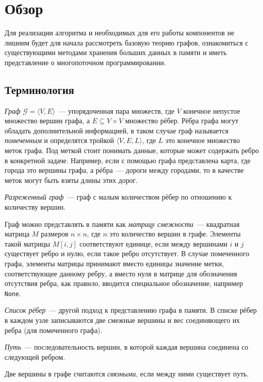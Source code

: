 
\section{Обзор}
\label{sec:relatedworks}
Для реализации алгоритма и необходимых для его работы компонентов не лишним будет для начала рассмотреть базовую теорию графов, ознакомиться с существующими методами хранения больших данных в памяти и иметь представление о многопоточном программировании.

\subsection{Терминология}
\textit{Граф} $\mathcal{G} = \langle V, E \rangle$~--- упорядоченная пара множеств, где $V$ конечное непустое множество вершин графа, а $E \subseteq V \times V$ множество рёбер. Рёбра графа могут обладать дополнительной информацией, в таком случае граф называется \textit{помеченным} и определятся тройкой $\langle V, E, L \rangle$, где $L$ это конечное множество меток графа. Под меткой стоит понимать данные, которые может содержать ребро в конкретной задаче. Например, если с помощью графа представлена карта, где города это вершины графа, а рёбра~--- дороги между городами, то в качестве меток могут быть взяты длины этих дорог.

\textit{Разреженный граф}~--- граф с малым количеством рёбер по отношению к количеству вершин.

Граф можно представлять в памяти как \textit{матрицу смежности}~--- квадратная матрица $M$ размеров $n \times n$, где $n$ это количество вершин в графе. Элементы такой матрицы $M[i,j]$ соответствуют единице, если между вершинами $i$ и $j$ существует ребро и нулю, если такое ребро отсутствует. В случае помеченного графа, элементы матрицы принимают вместо единицы значение метки, соответствующее данному ребру, а вместо нуля в матрице для обозначения отсутствия ребра, как правило, вводится специальное обозначение, например \texttt{None}.

\textit{Список рёбер}~--- другой подход к представлению графа в памяти. В списке рёбер в каждом узле записываются две смежные вершины и вес соединяющего 
их ребра (для помеченного графа).

\textit{Путь}~--- последовательность вершин, в которой каждая вершина соединена со следующей ребром.

Две вершины в графе считаются \textit{связными}, если между ними существует путь.

